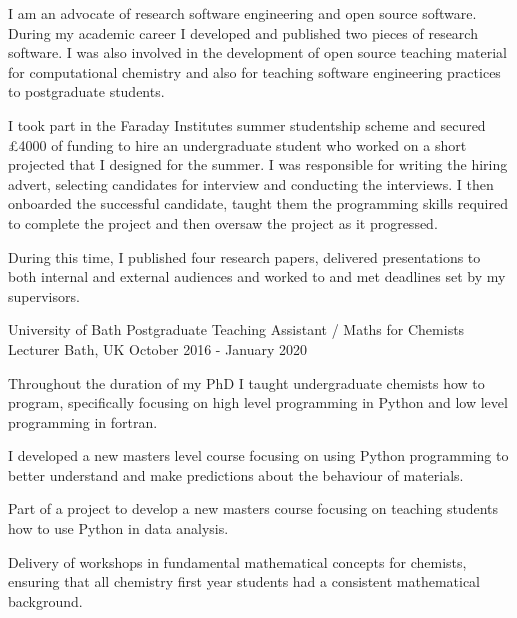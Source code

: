 \begin{cventries}
{\begin{cvitems}
        \item {I am an advocate of research software engineering and open source software. During my academic career I developed and published two pieces of research software. I was also involved in the development of open source teaching material for computational chemistry and also for teaching software engineering practices to postgraduate students.}
        \item {I took part in the Faraday Institutes summer studentship scheme and secured £4000 of funding to hire an undergraduate student who worked on a short projected that I designed for the summer. I was responsible for writing the hiring advert, selecting candidates for interview and conducting the interviews. I then onboarded the successful candidate, taught them the programming skills required to complete the project and then oversaw the project as it progressed.}
        \item {During this time, I published four research papers, delivered presentations to both internal and external audiences and worked to and met deadlines set by my supervisors.}
      \end{cvitems}
    }
    \cventry
    {University of Bath}    
    {Postgraduate Teaching Assistant / Maths for Chemists Lecturer}
    {Bath, UK}
    {October 2016 - January 2020}
    {
      \begin{cvitems}
        \item{Throughout the duration of my PhD I taught undergraduate chemists how to program, specifically focusing on high level programming in Python and low level programming in fortran.}
        \item{I developed a new masters level course focusing on using Python programming to better understand and make predictions about the behaviour of materials.}
        \item{Part of a project to develop a new masters course focusing on teaching students how to use Python in data analysis.}
        \item
        {Delivery of workshops in fundamental mathematical concepts for chemists, ensuring that all chemistry first year students had a consistent mathematical background.} 
      \end{cvitems}
    }
\end{cventries}
